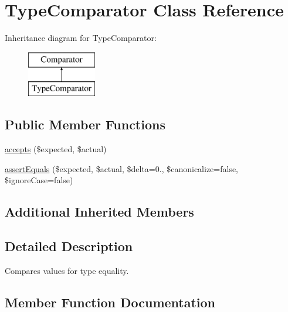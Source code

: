 \hypertarget{class_sebastian_bergmann_1_1_comparator_1_1_type_comparator}{}\section{Type\+Comparator Class Reference}
\label{class_sebastian_bergmann_1_1_comparator_1_1_type_comparator}
Inheritance diagram for Type\+Comparator\+:\begin{figure}[H]
\begin{center}
\leavevmode
\includegraphics[height=2.000000cm]{class_sebastian_bergmann_1_1_comparator_1_1_type_comparator}
\end{center}
\end{figure}
\subsection*{Public Member Functions}
\begin{DoxyCompactItemize}
\item 
\mbox{\hyperlink{class_sebastian_bergmann_1_1_comparator_1_1_type_comparator_ae9bdf0cba02ce3470169280656cdeb84}{accepts}} (\$expected, \$actual)
\item 
\mbox{\hyperlink{class_sebastian_bergmann_1_1_comparator_1_1_type_comparator_adb3679ea06503114394431cb250ec5a4}{assert\+Equals}} (\$expected, \$actual, \$delta=0., \$canonicalize=false, \$ignore\+Case=false)
\end{DoxyCompactItemize}
\subsection*{Additional Inherited Members}


\subsection{Detailed Description}
Compares values for type equality. 

\subsection{Member Function Documentation}
\mbox{\label{class_sebastian_bergmann_1_1_comparator_1_1_type_comparator_ae9bdf0cba02ce3470169280656cdeb84}} 
